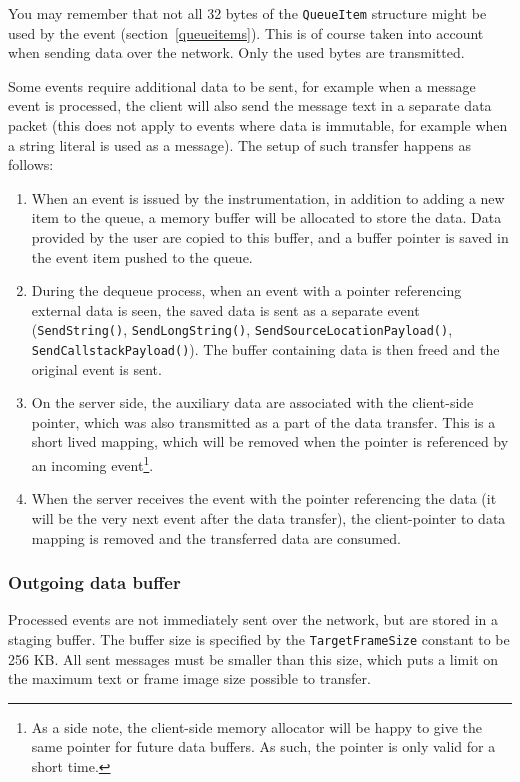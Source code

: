 \documentclass[hidelinks,titlepage,a4paper]{article}
\begin{document}
You may remember that not all 32 bytes of the \texttt{QueueItem} structure might be used by the event (section~\ref{queueitems}). This is of course taken into account when sending data over the network. Only the used bytes are transmitted.

Some events require additional data to be sent, for example when a message event is processed, the client will also send the message text in a separate data packet (this does not apply to events where data is immutable, for example when a string literal is used as a message). The setup of such transfer happens as follows:

\begin{enumerate}
\item When an event is issued by the instrumentation, in addition to adding a new item to the queue, a memory buffer will be allocated to store the data. Data provided by the user are copied to this buffer, and a buffer pointer is saved in the event item pushed to the queue.
\item During the dequeue process, when an event with a pointer referencing external data is seen, the saved data is sent as a separate event (\texttt{SendString()}, \texttt{SendLongString()}, \texttt{SendSourceLocationPayload()}, \texttt{SendCallstackPayload()}). The buffer containing data is then freed and the original event is sent.
\item On the server side, the auxiliary data are associated with the client-side pointer, which was also transmitted as a part of the data transfer. This is a short lived mapping, which will be removed when the pointer is referenced by an incoming event\footnote{As a side note, the client-side memory allocator will be happy to give the same pointer for future data buffers. As such, the pointer is only valid for a short time.}.
\item When the server receives the event with the pointer referencing the data (it will be the very next event after the data transfer), the client-pointer to data mapping is removed and the transferred data are consumed.
\end{enumerate}

\subsubsection{Outgoing data buffer}

Processed events are not immediately sent over the network, but are stored in a staging buffer. The buffer size is specified by the \texttt{TargetFrameSize} constant to be 256 KB. All sent messages must be smaller than this size, which puts a limit on the maximum text or frame image size possible to transfer.
\end{document}
